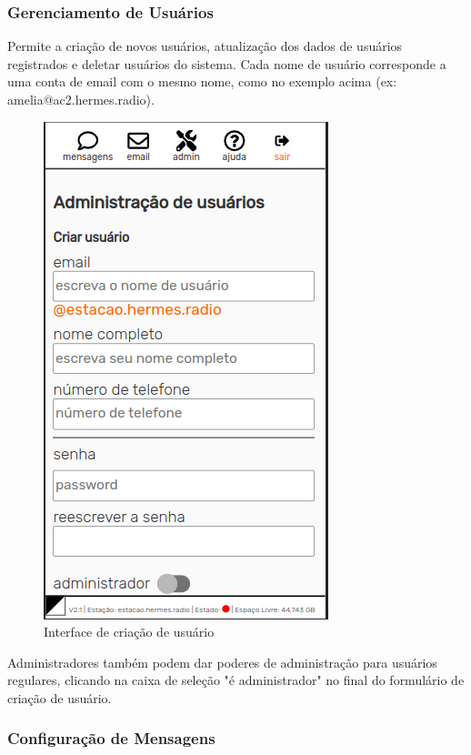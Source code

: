 \documentclass[11pt,a4paper]{article}
\begin{document}
\subsubsection{Gerenciamento de Usuários} 

Permite a criação de novos usuários, atualização dos dados de usuários registrados e deletar usuários do sistema. Cada nome de usuário corresponde a uma conta de email com o mesmo nome, como no exemplo acima (ex: amelia@ac2.hermes.radio).
    
    \begin{figure}[H]
    \centering
    \includegraphics[width=0.5\columnwidth]{screenshots/frontend/pt_kn/createuser.png}
    \caption{Interface de criação de usuário}
    \label{fig:createuser}
    \end{figure}
    
    Administradores também podem dar poderes de administração para usuários regulares, clicando na caixa de seleção "é administrador" no final do formulário de criação de usuário.

\subsubsection{Configuração de Mensagens}  
\label{gui_msg_admin}
\end{document}
